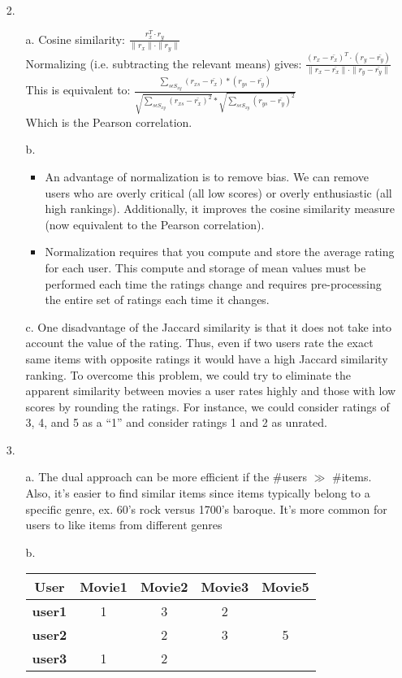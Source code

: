 \documentclass{article}
\begin{document}
\begin{itemize}
\pagebreak
\item[2.]
	\begin{itemize}
		\item[a.] Cosine similarity: $\frac{r_{x}^{T}\cdot r_{y}}{\parallel r_{x} \parallel \cdot \parallel r_{y} \parallel}$\\
		Normalizing (i.e. subtracting the relevant means) gives:
			$\frac{(r_{x} - \bar{r_{x}})^{T}\cdot (r_{y}-\bar{r_{y}})}{\parallel r_{x} - \bar{r_{x}} \parallel \cdot \parallel r_{y}-\bar{r_{y}} \parallel}$\\
		 This is equivalent to: 
		 	$\frac{\sum_{s \epsilon S_{xy}} (r_{xs} - \bar{r_{x}})*(r_{ys}-\bar{r_{y}})}{\sqrt{\sum_{s \epsilon S_{xy}} (r_{xs} - \bar{r_{x}})^{2}} * \sqrt{\sum_{s \epsilon S_{xy}} (r_{ys}-\bar{r_{y}})^{2}}}$\\
		 	Which is the Pearson correlation.
		\item[b.] 
			\begin{itemize}
				\item An advantage of normalization is to remove bias. We can remove users who are overly critical (all low scores) or overly enthusiastic (all high rankings). Additionally, it improves the cosine similarity measure (now equivalent to the Pearson correlation).
				\item Normalization requires that you compute and store the average rating for each user. This compute and storage of mean values must be performed each time the ratings change and requires pre-processing the entire set of ratings each time it changes.
			\end{itemize}
		\item[c.] One disadvantage of the Jaccard similarity is that it does not take into account the value of the rating. Thus, even if two users rate the exact same items with opposite ratings it would have a high Jaccard similarity ranking. To overcome this problem, we could try to eliminate the apparent similarity between movies a user rates highly and those with low scores by rounding the ratings. For instance, we could consider ratings of 3, 4, and 5 as a ``1'' and consider ratings 1 and 2 as unrated.
	\end{itemize}

\pagebreak
\item[3.]
	\begin{itemize}
		\item[a.] The dual approach can be more efficient if the \#users $\gg$ \#items. Also, it's easier to find similar items since items typically belong to a specific genre, ex. 60's rock versus 1700's baroque. It's more common for users to like items from different genres
		\item[b.]
			\begin{tabular}{|c||c|c|c|c|}
			\hline 
				\textbf{User} & \textbf{Movie1} & \textbf{Movie2} & \textbf{Movie3} & \textbf{Movie5}\\
			\hline
				\textbf{user1} & 1 & 3 & 2 & \\
				\textbf{user2} &  & 2 & 3 & 5\\
				\textbf{user3} & 1 & 2 &  & \\
			\hline
			\end{tabular}
			

\end{itemize}
\end{itemize}
\end{document}
